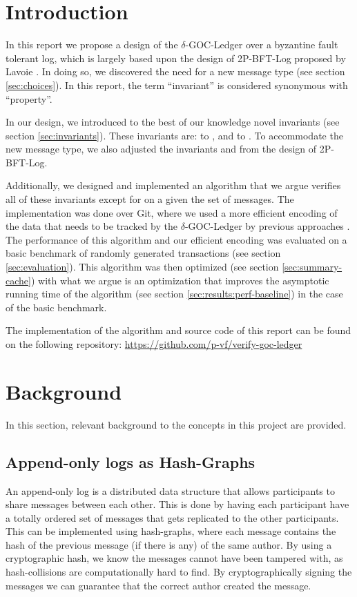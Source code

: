 \chapter{Introduction}
In this report we propose a design of the $\delta$-GOC-Ledger \cite{delta-goc-ledger-heisch} over a byzantine fault tolerant log, which is largely based upon the design of 2P-BFT-Log proposed by Lavoie \cite{2p-bft-log}. In doing so, we discovered the need for a new message type (see section \ref{sec:choices}). In this report, the term ``invariant'' is considered synonymous with ``property''.

In our design, we introduced to the best of our knowledge novel invariants (see section \ref{sec:invariants}). These invariants are:  to ,  and  to . To accommodate the new message type, we also adjusted the invariants  and  from the design of 2P-BFT-Log.

Additionally, we designed and implemented an algorithm that we argue verifies all of these invariants except for  on a given the set of messages. The implementation was done over Git, where we used a more efficient encoding of the data that needs to be tracked by the $\delta$-GOC-Ledger by previous approaches \cite{delta-goc-ledger-heisch}.
The performance of this algorithm and our efficient encoding was evaluated on a basic benchmark of randomly generated transactions (see section \ref{sec:evaluation}).
This algorithm was then optimized (see section \ref{sec:summary-cache}) with what we argue is an optimization that improves the asymptotic running time of the algorithm (see section \ref{sec:results:perf-baseline}) in the case of the basic benchmark.

The implementation of the algorithm and source code of this report can be found on the following repository: \url{https://github.com/p-vf/verify-goc-ledger}

\chapter{Background}
In this section, relevant background to the concepts in this project are provided. \\

\section{Append-only logs as Hash-Graphs}
An append-only log is a distributed data structure that allows participants to share messages between each other. This is done by having each participant have a totally ordered set of messages that gets replicated to the other participants. This can be implemented using hash-graphs, where each message contains the hash of the previous message (if there is any) of the same author. By using a cryptographic hash, we know the messages cannot have been tampered with, as hash-collisions are computationally hard to find. By cryptographically signing the messages we can guarantee that the correct author created the message.

